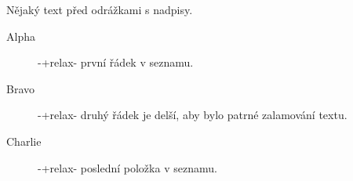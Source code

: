 Nějaký text před odrážkami s nadpisy.
\begin{description}
   \item[Alpha] -+relax- první řádek v seznamu.
   \item[Bravo] -+relax- druhý řádek je delší, aby bylo
     patrné zalamování textu.
   \item[Charlie] -+relax- poslední položka v seznamu.
\end{description}